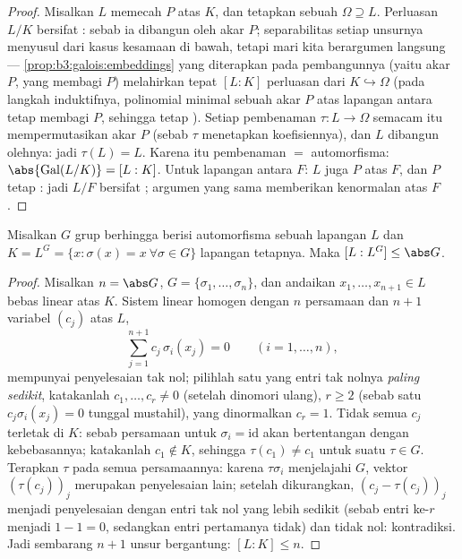 \begin{proof}
Misalkan $L$ memecah  $P$ atas $K$, dan tetapkan sebuah
 $\Omega \supseteq L$. Perluasan $L/K$ bersifat : sebab ia dibangun
oleh akar $P$; separabilitas setiap unsurnya menyusul dari
kasus kesamaan di bawah, tetapi mari kita berargumen langsung ---
\cref{prop:b3:galois:embeddings} yang diterapkan pada pembangunnya (yaitu akar
 $P$, yang  membagi $P$)
melahirkan tepat $[L:K]$ perluasan dari $K \hookrightarrow \Omega$
(pada langkah induktifnya, polinomial minimal sebuah akar $P$
atas lapangan antara tetap membagi $P$, sehingga tetap
). Setiap pembenaman $\tau \colon L \to \Omega$ semacam itu
mempermutasikan akar $P$ (sebab $\tau$ menetapkan koefisiennya), dan
$L$ dibangun olehnya: jadi $\tau(L) = L$. Karena itu pembenaman $=$
automorfisma: $\abs{\operatorname{Gal}(L/K)} = [L:K]$. Untuk
lapangan antara $F$: $L$ juga  $P$ atas
$F$, dan $P$ tetap : jadi $L/F$ bersifat ; argumen yang sama
memberikan kenormalan atas $F$.
\end{proof}

\begin{lemma}[Artin]\label{lem:b3:galois:artin}
Misalkan $G$ grup berhingga berisi automorfisma sebuah lapangan $L$ dan
$K = L^G = \{x : \sigma(x) = x\ \forall\sigma \in G\}$ lapangan
tetapnya. Maka $[L : L^G] \leq \abs G$.
\end{lemma}

\begin{proof}
Misalkan $n = \abs G$, $G = \{\sigma_1, \dots, \sigma_n\}$, dan
andaikan $x_1, \dots, x_{n+1} \in L$ bebas linear atas
$K$. Sistem linear homogen dengan $n$ persamaan dan $n+1$
variabel $(c_j)$ atas $L$,
\[
\sum_{j=1}^{n+1} c_j\,\sigma_i(x_j) = 0
\qquad (i = 1, \dots, n),
\]
mempunyai penyelesaian tak nol; pilihlah satu yang entri tak nolnya
\emph{paling sedikit}, katakanlah $c_1, \dots, c_r \neq 0$ (setelah dinomori ulang), $r \geq 2$
(sebab satu $c_j\sigma_i(x_j) = 0$ tunggal mustahil), yang dinormalkan
$c_r = 1$. Tidak semua $c_j$ terletak di $K$: sebab persamaan untuk $\sigma_i =
\mathrm{id}$ akan bertentangan dengan kebebasannya; katakanlah $c_1 \notin K$,
sehingga $\tau(c_1) \ne c_1$ untuk suatu $\tau \in G$. Terapkan $\tau$ pada semua
persamaannya: karena $\tau\sigma_i$ menjelajahi $G$, vektor
$(\tau(c_j))_j$ merupakan penyelesaian lain; setelah dikurangkan, $(c_j -
\tau(c_j))_j$ menjadi penyelesaian dengan entri tak nol yang lebih sedikit (sebab
entri ke-$r$ menjadi $1 - 1 = 0$, sedangkan entri pertamanya tidak) dan tidak
nol: kontradiksi. Jadi sembarang $n+1$ unsur bergantung: $[L:K]
\leq n$.
\end{proof}


